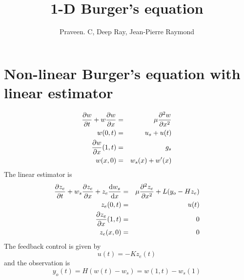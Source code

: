 \documentclass[12pt]{article}
\title{1-D Burger's equation}
\author{Praveen. C, Deep Ray, Jean-Pierre Raymond}
\begin{document}
\maketitle


\section{Non-linear Burger's equation with linear estimator}
\begin{eqnarray*}
\frac{\partial w}{\partial t} + w \frac{\partial w}{\partial x} &=& \mu \frac{\partial ^2 w}{\partial x^2} \\
w(0,t) &=& u_s + u(t) \\
\frac{\partial w}{\partial x}(1,t) &=& g_s \\
w(x,0) &=& w_s(x) + w'(x)
\end{eqnarray*}
The linear estimator is
\begin{eqnarray*}
\frac{\partial z_e}{\partial t} + w_s \frac{\partial z_e}{\partial x} + z_e \frac{\textrm{d} w_s}{\textrm{d} x} &=& \mu \frac{\partial ^2 z_e}{\partial x^2} + L(y_o - Hz_e) \\
z_e(0,t) &=& u(t) \\
\frac{\partial z_e}{\partial x}(1,t) &=& 0 \\
z_e(x,0) &=& 0
\end{eqnarray*}
The feedback control is given by
\[
u(t) = -K z_e(t)
\]
and the observation is
\[
y_o(t) = H(w(t) - w_s) = w(1,t) - w_s(1)
\]
\end{document}
